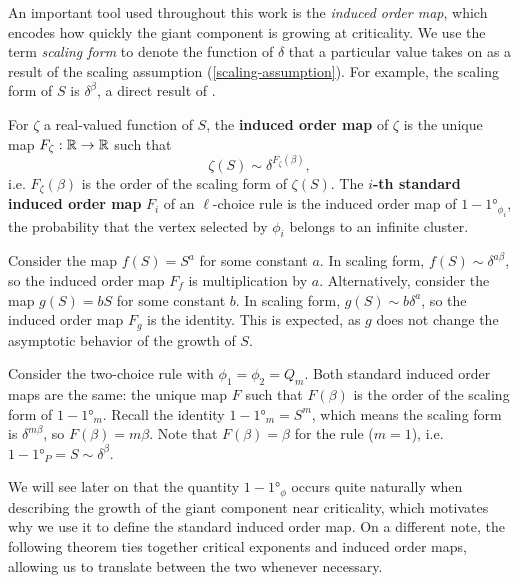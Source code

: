 \documentclass[twoside,10pt]{article}
\begin{document}
An important tool used throughout this work is the \emph{induced order map}, which encodes how quickly the giant component is growing at criticality. We use the term \emph{scaling form} to denote the function of $\delta$ that a particular value takes on as a result of the scaling assumption (\ref{scaling-assumption}). For example, the scaling form of $S$ is $\delta^{\beta}$, a direct result of .

\begin{defn}[]
	For $\zeta$ a real-valued function of $S$, the \textbf{induced order map} of $\zeta$ is the unique map $F_{\zeta}:\mathbb{R}\to \mathbb{R}$ such that
	\[
	\zeta(S) \sim \delta^{F_{\zeta}(\beta)},
	\] i.e. $F_{\zeta}(\beta)$ is the order of the scaling form of $\zeta(S)$. The \textbf{$i$-th standard induced order map} $F_{i}$ of an $\ell$-choice rule is the induced order map of $1 - \ang{1}_{\phi_{i}}$, the probability that the vertex selected by $\phi_i$ belongs to an infinite cluster.
\end{defn}

\begin{ex}[]
Consider the map $f(S) = S^{a}$ for some constant $a$. In scaling form, $f(S) \sim \delta^{a \beta}$, so the induced order map $F_{f}$ is multiplication by $a$. Alternatively, consider the map $g(S) = b S$ for some constant $b$. In scaling form, $g(S) \sim b \delta^{a}$, so the induced order map $F_{g}$ is the identity. This is expected, as $g$ does not change the asymptotic behavior of the growth of $S$.
\end{ex}

\begin{ex}[]
	Consider the two-choice rule with $\phi_1 = \phi_2 = Q_{m}$. Both standard induced order maps are the same: the unique map $F$ such that $F(\beta)$ is the order of the scaling form of $1 - \ang{1}_{m}$. Recall the identity $1-\ang{1}_{m}= S^{m}$, which means the scaling form is $\delta^{m \beta}$, so $F(\beta) = m\beta$. Note that $F(\beta)=\beta$ for the \ER rule ($m=1$), i.e. $1 - \ang{1}_{P} = S \sim \delta^{\beta}$.
\end{ex}

We will see later on that the quantity $1-\ang{1}_{\phi}$ occurs quite naturally when describing the growth of the giant component near criticality, which motivates why we use it to define the standard induced order map. On a different note, the following theorem ties together critical exponents and induced order maps, allowing us to translate between the two whenever necessary.
\end{document}
